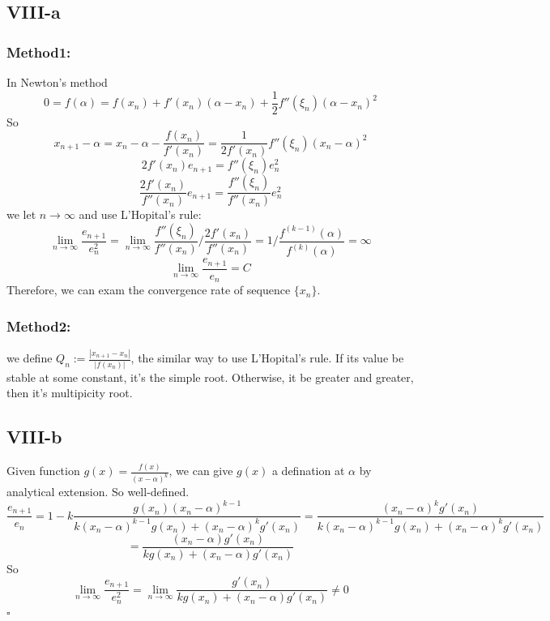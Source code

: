 \documentclass[a4paper]{article}
\begin{document}
\subsection*{VIII-a}
\subsubsection*{Method1:}
In Newton's method
\[
0 = f(\alpha) = f(x_n) + f'(x_n)(\alpha - x_n) + \frac{1}{2}f''(\xi_n)(\alpha - x_n)^2 
\]
So
\[
x_{n+1} - \alpha = x_n - \alpha - \frac{f(x_n)}{f'(x_n)} = \frac{1}{2f'(x_n)}f''(\xi_n)(x_n -\alpha)^2
\]
\[
2f'(x_n)e_{n+1} =  f''(\xi_n)e_n^2
\]
\[
\frac{2f'(x_n)}{f''(x_n)}e_{n+1} =  \frac{f''(\xi_n)}{f''(x_n)}e_n^2
\]
we let $n \rightarrow \infty$ and use L'Hopital's rule:
\[
\lim_{n \rightarrow \infty}\frac{e_{n+1}}{e_n^2} = \lim_{n \rightarrow \infty} \frac{f''(\xi_n)}{f''(x_n)} /\frac{2f'(x_n)}{f''(x_n)} = 1/\frac{f^{(k-1)}(\alpha)}{f^{(k)}(\alpha)} = \infty
\]
\[
\lim_{n \rightarrow \infty}\frac{e_{n+1}}{e_n} = C
\]
Therefore, we can exam the convergence rate of sequence $\{x_n\}$.
\subsubsection*{Method2:}
we define $Q_n := \frac{|x_{n+1} - {x_n}|}{|f(x_n)|}$, the similar way to use L'Hopital's rule.
If its value be stable at some constant, it's the simple root. Otherwise, it be greater and greater, then it's multipicity root.
\subsection*{VIII-b}
Given function $g(x) = \frac{f(x)}{(x-\alpha)^k}$, we can give $g(x)$ a defination at $\alpha$ by analytical extension.
So well-defined.
\[
\frac{e_{n+1}}{e_n} = 1 - k\frac{g(x_n)(x_n - \alpha)^{k-1}}{k(x_n - \alpha)^{k-1}g(x_n) + (x_n - \alpha)^kg'(x_n)} = \frac{(x_n - \alpha)^kg'(x_n)}{k(x_n - \alpha)^{k-1}g(x_n) + (x_n - \alpha)^kg'(x_n)}
\]
\[
= \frac{(x_n - \alpha)g'(x_n)}{kg(x_n) + (x_n - \alpha)g'(x_n)}
\]
So
\[
\lim_{n \rightarrow \infty}\frac{e_{n+1}}{e_n^2} = \lim_{n \rightarrow \infty}\frac{g'(x_n)}{kg(x_n) + (x_n - \alpha)g'(x_n)} \neq 0
\]
\hfill$\square$
\end{document}
